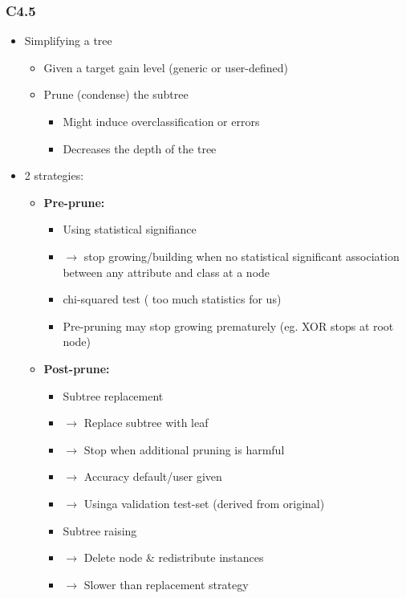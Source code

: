 \begin{frame}[allowframebreaks]
\frametitle{C4.5}
\begin{itemize}
\item Simplifying a tree
\vfill
\begin{itemize}
\item Given a target gain level (generic or user-defined)
\vfill
\item Prune (condense) the subtree
\vfill
\begin{itemize}
\item Might induce overclassification or errors
\vfill
\item Decreases the depth of the tree 
\vfill
\end{itemize}
\end{itemize}
\item 2 strategies:
\vfill
\begin{itemize}
\item \textbf{Pre-prune:}
\vfill
\begin{itemize}
\item Using statistical signifiance
\vfill
\item $\rightarrow$ stop growing/building when no statistical significant association between any attribute and class at a node
\vfill
\item chi-squared test ( too much statistics for us)
\vfill
\item Pre-pruning may stop growing prematurely (eg. XOR stops at root node)
\vfill
\end{itemize}
\framebreak
\item \textbf{Post-prune:}
\begin{itemize}
\item Subtree replacement
\vfill
\item $\rightarrow$ Replace subtree with leaf
\vfill
\item $\rightarrow$ Stop when additional pruning is harmful
\vfill
\item $\rightarrow$ Accuracy default/user given
\vfill
\item $\rightarrow$ Usinga validation test-set (derived from original)
\vfill
\item Subtree raising
\vfill
\item $\rightarrow$ Delete node \& redistribute instances
\vfill
\item $\rightarrow$ Slower than replacement strategy
\end{itemize}
\end{itemize}
\end{itemize}


\end{frame}


